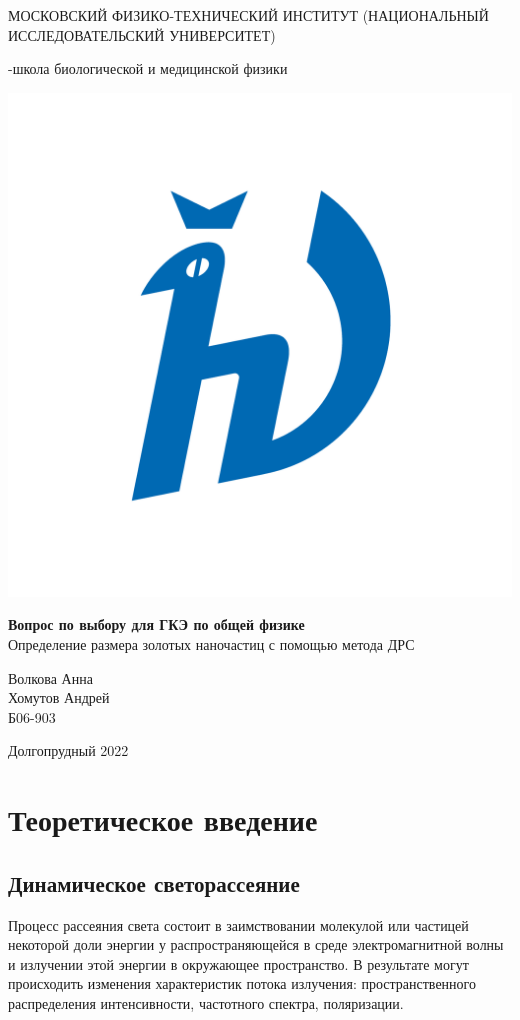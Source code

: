 \documentclass[a4paper,12pt]{article} %
\begin{document}
\begin{titlepage}
\begin{center}
    {\large МОСКОВСКИЙ ФИЗИКО-ТЕХНИЧЕСКИЙ ИНСТИТУТ (НАЦИОНАЛЬНЫЙ ИССЛЕДОВАТЕЛЬСКИЙ УНИВЕРСИТЕТ)}
\end{center}
\begin{center}
    {-школа биологической и медицинской физики}
\end{center}


    \vspace{3.5cm}

\begin{center}
    \includegraphics[width=0.35\linewidth]{hv_full.png}
\end{center}
\vspace{0.1cm}
{\huge
\begin{center}
    {\bf Вопрос по выбору для ГКЭ по общей физике}\\
    Определение размера золотых наночастиц с помощью метода ДРС
\end{center}
}
\vspace{2cm}
\begin{flushright}
{\LARGE Волкова Анна \\
Хомутов Андрей \\ 
\vspace{0.2cm}
Б06-903}
\end{flushright}
\vspace{2.5cm}
\begin{center}
    Долгопрудный 2022
\end{center}
\end{titlepage}

\section{Теоретическое введение}
\subsection{Динамическое светорассеяние}
Процесс рассеяния света состоит в заимствовании молекулой или частицей некоторой доли энергии у распространяющейся в среде электромагнитной волны и излучении этой энергии в окружающее пространство. В результате могут происходить изменения характеристик потока излучения: пространственного распределения интенсивности, частотного спектра, поляризации.
\end{document}
